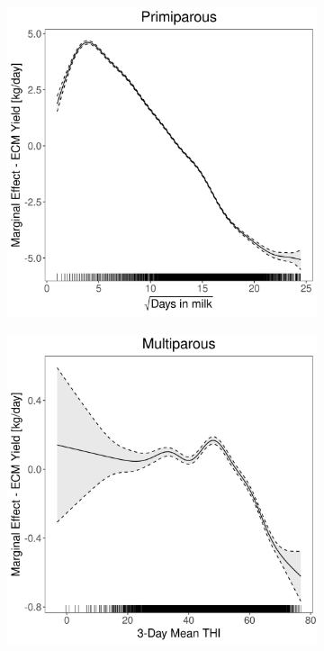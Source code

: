 \begin{figure}[H]
\begin{subfigure}[b]{0.45\textwidth}
    \end{subfigure}
    \hspace{0.05\textwidth} %
    \begin{subfigure}[b]{0.45\textwidth}
        \centering
        \includegraphics[width=\textwidth]{thesis/figures/models/ecm/after2010/bs_ecm_after2010/bs_ecm_after2010_marginal_dim_milk_primi.png}
    \end{subfigure}
    \begin{subfigure}[b]{0.45\textwidth}
        \centering
        \includegraphics[width=\textwidth]{thesis/figures/models/ecm/after2010/bs_ecm_after2010/bs_ecm_after2010_marginal_thi_milk_multi.png}

\end{subfigure}
\end{figure}

